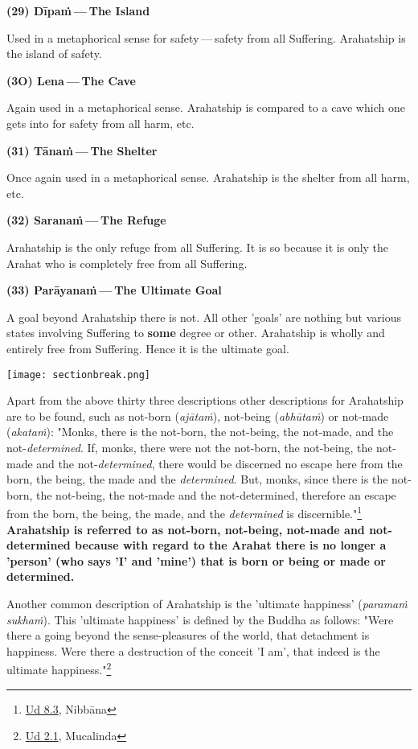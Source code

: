 \textbf{(29) Dīpaṁ --- The Island}

Used in a metaphorical sense for safety --- safety from all Suffering. Arahatship is the island of safety.

\textbf{(3O) Lena --- The Cave}

Again used in a metaphorical sense. Arahatship is compared to a cave which one gets into for safety from all harm, etc.

\textbf{(31) Tānaṁ --- The Shelter}

Once again used in a metaphorical sense. Arahatship is the shelter from all harm, etc.

\textbf{(32) Saranaṁ --- The Refuge}

Arahatship is the only refuge from all Suffering. It is so because it is only the Arahat who is completely free from all Suffering.

\textbf{(33) Parāyanaṁ --- The Ultimate Goal}

A goal beyond Arahatship there is not. All other 'goals' are nothing but various states involving Suffering to \textbf{some} degree or other. Arahatship is wholly and entirely free from Suffering. Hence it is the ultimate goal.

\texttt{[image: sectionbreak.png]}

Apart from the above thirty three descriptions other descriptions for Arahatship are to be found, such as not-born (\emph{ajātaṁ}), not-being (\emph{abhūtaṁ}) or not-made (\emph{akataṁ}): "Monks, there is the not-born, the not-being, the not-made, and the not-\emph{determined}. If, monks, there were not the not-born, the not-being, the not-made and the not-\emph{determined}, there would be discerned no escape here from the born, the being, the made and the \emph{determined}. But, monks, since there is the not-born, the not-being, the not-made and the not-determined, therefore an escape from the born, the being, the made, and the \emph{determined} is discernible."\footnote{\href{https://suttacentral.net/ud8.3/en/anandajoti}{Ud 8.3}, Nibbāna} \textbf{Arahatship is referred to as not-born, not-being, not-made and not-determined because with regard to the Arahat there is no longer a 'person' (who says 'I' and 'mine') that is born or being or made or determined.}

Another common description of Arahatship is the 'ultimate happiness' (\emph{paramaṁ sukhaṁ}). This 'ultimate happiness' is defined by the Buddha as follows: "Were there a going beyond the sense-pleasures of the world, that detachment is happiness. Were there a destruction of the conceit 'I am', that indeed is the ultimate happiness."\footnote{\href{https://suttacentral.net/ud2.1/en/anandajoti}{Ud 2.1}, Mucalinda}

